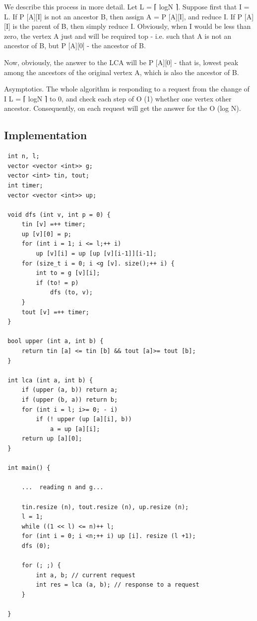 We describe this process in more detail. Let L = ⌈ logN ⌉. Suppose first that I = L. If P [A][I] is not an ancestor B, then assign A = P [A][I], and reduce I. If P [A][I] is the parent of B, then simply reduce I. Obviously, when I would be less than zero, the vertex A just and will be required top - i.e. such that A is not an ancestor of B, but P [A][0] - the ancestor of B.

Now, obviously, the answer to the LCA will be P [A][0] - that is, lowest peak among the ancestors of the original vertex A, which is also the ancestor of B.

Asymptotics. The whole algorithm is responding to a request from the change of I L = ⌈ logN ⌉ to 0, and check each step of O (1) whether one vertex other ancestor. Consequently, on each request will get the answer for the O (log N).

\subsection{ Implementation }
\begin{verbatim}
 int n, l;
 vector <vector <int>> g;
 vector <int> tin, tout;
 int timer;
 vector <vector <int>> up;

 void dfs (int v, int p = 0) {
     tin [v] =++ timer;
     up [v][0] = p;
     for (int i = 1; i <= l;++ i)
         up [v][i] = up [up [v][i-1]][i-1];
     for (size_t i = 0; i <g [v]. size();++ i) {
         int to = g [v][i];
         if (to! = p)
             dfs (to, v);
     }
     tout [v] =++ timer;
 }

 bool upper (int a, int b) {
     return tin [a] <= tin [b] && tout [a]>= tout [b];
 }

 int lca (int a, int b) {
     if (upper (a, b)) return a;
     if (upper (b, a)) return b;
     for (int i = l; i>= 0; - i)
         if (! upper (up [a][i], b))
             a = up [a][i];
     return up [a][0];
 }

 int main() {

     ...  reading n and g...

     tin.resize (n), tout.resize (n), up.resize (n);
     l = 1;
     while ((1 << l) <= n)++ l;
     for (int i = 0; i <n;++ i) up [i]. resize (l +1);
     dfs (0);

     for (; ;) {
         int a, b; // current request
         int res = lca (a, b); // response to a request
     }

 } 
\end{verbatim}
